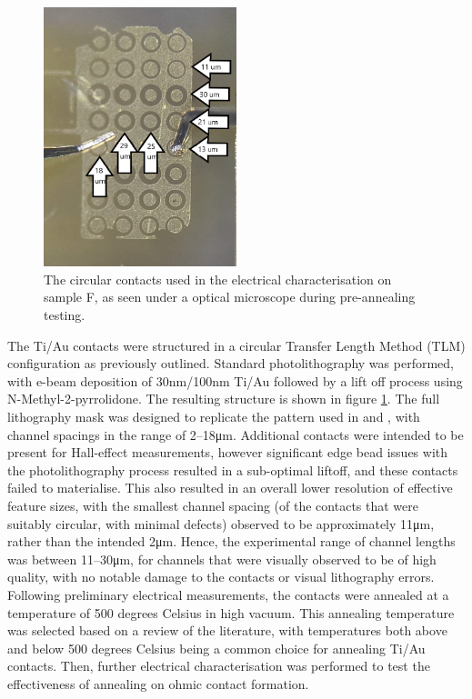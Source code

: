 \begin{figure}[h]
    \centering
    \includegraphics[width=0.5\textwidth]{Chapter6/Figs/Raster/Sample F 2022/111 062022 CTLM labelled.png}
    \caption{The circular contacts used in the electrical characterisation on sample F, as seen under a optical microscope during pre-annealing testing.}
    \label{fig:sampleF}
\end{figure}

The Ti/Au contacts were structured in a circular Transfer Length Method (TLM) configuration as previously outlined. Standard photolithography was performed, with e-beam deposition of 30\si{\nano\metre}/100\si{\nano\metre} Ti/Au followed by a lift off process using N-Methyl-2-pyrrolidone. The resulting structure is shown in figure \ref{fig:sampleF}. The full lithography mask was designed to replicate the pattern used in \cite{kato2009} and \cite{matsumoto2013}, with channel spacings in the range of 2--18\si{\micro\metre}. Additional contacts were intended to be present for Hall-effect measurements, however significant edge bead issues with the photolithography process resulted in a sub-optimal liftoff, and these contacts failed to materialise. This also resulted in an overall lower resolution of effective feature sizes, with the smallest channel spacing (of the contacts that were suitably circular, with minimal defects) observed to be approximately 11\si{\micro\metre}, rather than the intended 2\si{\micro\metre}. Hence, the experimental range of channel lengths was between 11--30\si{\micro\metre}, for channels that were visually observed to be of high quality, with no notable damage to the contacts or visual lithography errors. Following preliminary electrical measurements, the contacts were annealed at a temperature of 500 degrees Celsius in high vacuum. This annealing temperature was selected based on a review of the literature, with temperatures both above and below 500 degrees Celsius being a common choice for annealing Ti/Au contacts. Then, further electrical characterisation was performed to test the effectiveness of annealing on ohmic contact formation.

